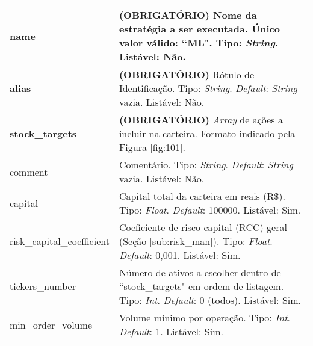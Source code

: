 {\begin{longtable}[m]{| m{11em} | m{21em} |}
    \hline
    \textbf{name} & \textbf{(OBRIGATÓRIO)} Nome da estratégia a ser executada. Único valor válido: ``ML". Tipo: \textit{String}. Listável: Não. \\
    \hline
    \textbf{alias} & \textbf{(OBRIGATÓRIO)} Rótulo de Identificação. Tipo: \textit{String}. \textit{Default}: \textit{String} vazia. Listável: Não. \\
    \hline
    \textbf{stock\_targets} & \textbf{(OBRIGATÓRIO)} \textit{Array} de ações a incluir na carteira. Formato indicado pela Figura \ref{fig:101}. \\
    \hline
    comment & Comentário. Tipo: \textit{String}. \textit{Default}: \textit{String} vazia. Listável: Não. \\
    \hline
    capital & Capital total da carteira em reais (R\$). Tipo: \textit{Float}. \textit{Default}: 100000. Listável: Sim. \\
    \hline
    risk\_capital\_coefficient & Coeficiente de risco-capital (RCC) geral (Seção \ref{sub:risk_man}). Tipo: \textit{Float}. \textit{Default}: 0,001. Listável: Sim. \\
    \hline
    tickers\_number & Número de ativos a escolher dentro de ``stock\_targets" em ordem de listagem. Tipo: \textit{Int}. \textit{Default}: 0 (todos). Listável: Sim. \\
    \hline
    min\_order\_volume & Volume mínimo por operação. Tipo: \textit{Int}. \textit{Default}: 1. Listável: Sim. \\

\end{longtable}}
